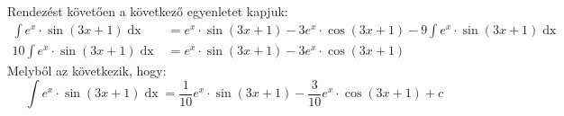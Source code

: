 \documentclass[a4paper,12pt]{article}
\theoremstyle{definition}
\begin{document}
\begin{question}
\begin{tasks}
{				Rendezést követően a következő egyenletet kapjuk:
				\begin{align*}
					\int{e^x \cdot \sin{(3x+1)} \mathop{dx}} &= e^x \cdot \sin{(3x+1)} - 3e^x \cdot \cos{(3x+1)} - 9\int{e^x \cdot \sin{(3x+1)} \mathop{dx}} \\
					10\int{e^x \cdot \sin{(3x+1)} \mathop{dx}} &= e^x \cdot \sin{(3x+1)} - 3e^x \cdot \cos{(3x+1)} 
				\end{align*}
				Melyből az következik, hogy:
				\[
					\int{e^x \cdot \sin{(3x+1)} \mathop{dx}} =  \frac{1}{10}e^x \cdot \sin{(3x+1)} -\frac{3}{10}e^x \cdot \cos{(3x+1)} + c
				\]
			}
		\end{tasks}
	\end{question}
\end{document}
